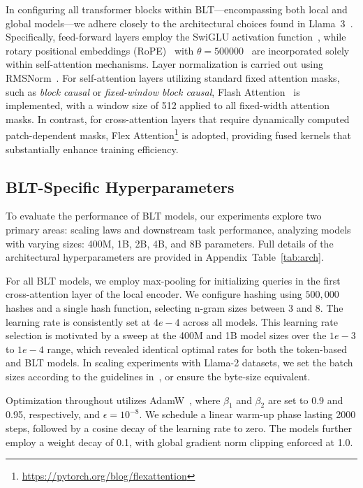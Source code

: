 In configuring all transformer blocks within {\textsc BLT}—encompassing both local and global models—we adhere closely to the architectural choices found in Llama~3~\citep{dubey2024llama}. Specifically, feed-forward layers employ the SwiGLU activation function~\citep{swiglu}, while rotary positional embeddings (RoPE)~\citep{RoPe} with $\theta=500000$~\citep{xiong2024effective} are incorporated solely within self-attention mechanisms. Layer normalization is carried out using RMSNorm~\citep{RMSNorm}. For self-attention layers utilizing standard fixed attention masks, such as \textit{block causal} or \textit{fixed-window block causal}, Flash Attention~\citep{dao2022flashattention} is implemented, with a window size of 512 applied to all fixed-width attention masks. In contrast, for cross-attention layers that require dynamically computed patch-dependent masks, Flex Attention\footnote{\url{https://pytorch.org/blog/flexattention}} is adopted, providing fused kernels that substantially enhance training efficiency.

\subsection{{\textsc BLT}-Specific Hyperparameters}

To evaluate the performance of {\textsc BLT} models, our experiments explore two primary areas: scaling laws and downstream task performance, analyzing models with varying sizes: 400M, 1B, 2B, 4B, and 8B parameters. Full details of the architectural hyperparameters are provided in Appendix~Table~\ref{tab:arch}.

For all {\textsc BLT} models, we employ max-pooling for initializing queries in the first cross-attention layer of the local encoder. We configure hashing using $500,000$ hashes and a single hash function, selecting n-gram sizes between 3 and 8. The learning rate is consistently set at $4e-4$ across all models. This learning rate selection is motivated by a sweep at the 400M and 1B model sizes over the $1e-3$ to $1e-4$ range, which revealed identical optimal rates for both the token-based and {\textsc BLT} models. In scaling experiments with Llama-2 datasets, we set the batch sizes according to the guidelines in~\cite{dubey2024llama}, or ensure the byte-size equivalent.

Optimization throughout utilizes AdamW~\citep{adamw}, where $\beta_1$ and $\beta_2$ are set to 0.9 and 0.95, respectively, and $\epsilon=10^{-8}$. We schedule a linear warm-up phase lasting 2000 steps, followed by a cosine decay of the learning rate to zero. The models further employ a weight decay of 0.1, with global gradient norm clipping enforced at 1.0.

